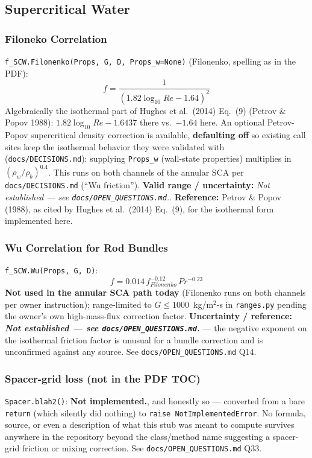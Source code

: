 \documentclass[11pt]{article}
\newcommand{\code}[1]{\texttt{#1}}
\newcommand{\notimpl}{\textbf{Not implemented.}}
\newcommand{\notest}{\textit{Not established --- see \code{docs/OPEN\_QUESTIONS.md}.}}
\begin{document}
\subsection{Supercritical Water}

\subsubsection{Filoneko Correlation}

\code{f\_SCW.Filonenko(Props, G, D, Props\_w=None)} (Filonenko, spelling as in the PDF):
\[
  f = \frac{1}{(1.82\log_{10}Re - 1.64)^2}
\]
Algebraically the isothermal part of Hughes et al.\ (2014) Eq.\ (9) (Petrov \& Popov
1988): $1.82\log_{10}Re - 1.6437$ there vs.\ $-1.64$ here. An optional Petrov-Popov
supercritical density correction is available, \textbf{defaulting off} so existing call
sites keep the isothermal behavior they were validated with (\code{docs/DECISIONS.md}):
supplying \code{Props\_w} (wall-state properties) multiplies in
$(\rho_w/\rho_b)^{0.4}$. This runs on both channels of the annular SCA per
\code{docs/DECISIONS.md} (``Wu friction''). \textbf{Valid range / uncertainty:}
\notest{}. \textbf{Reference:} Petrov \& Popov (1988), as cited by Hughes et al.\ (2014)
Eq.\ (9), for the isothermal form implemented here.

\subsubsection{Wu Correlation for Rod Bundles}

\code{f\_SCW.Wu(Props, G, D)}:
\[
  f = 0.014\,f_{Filonenko}^{-0.12}\,Pr^{-0.23}
\]
\textbf{Not used in the annular SCA path today} (Filonenko runs on both channels per
owner instruction); range-limited to $G\le1000$~kg/m$^2$-s in \code{ranges.py} pending
the owner's own high-mass-flux correction factor. \textbf{Uncertainty / reference:
\notest{}} --- the negative exponent on the isothermal friction factor is unusual for a
bundle correction and is unconfirmed against any source. See
\code{docs/OPEN\_QUESTIONS.md} Q14.

\subsubsection*{Spacer-grid loss (not in the PDF TOC)}

\code{Spacer.blah2()}: \notimpl{}, and honestly so --- converted from a bare
\code{return} (which silently did nothing) to \code{raise NotImplementedError}. No
formula, source, or even a description of what this stub was meant to compute survives
anywhere in the repository beyond the class/method name suggesting a spacer-grid
friction or mixing correction. See \code{docs/OPEN\_QUESTIONS.md} Q33.
\end{document}
